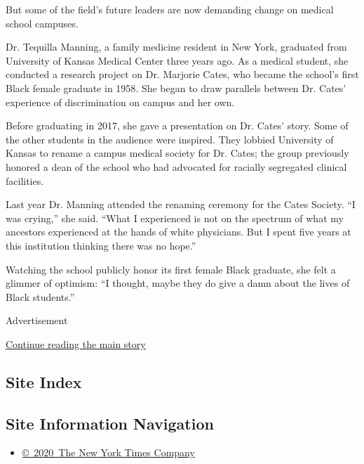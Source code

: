 But some of the field's future leaders are now demanding change on
medical school campuses.

Dr. Tequilla Manning, a family medicine resident in New York, graduated
from University of Kansas Medical Center three years ago. As a medical
student, she conducted a research project on Dr. Marjorie Cates, who
became the school's first Black female graduate in 1958. She began to
draw parallels between Dr. Cates' experience of discrimination on campus
and her own.

Before graduating in 2017, she gave a presentation on Dr. Cates' story.
Some of the other students in the audience were inspired. They lobbied
University of Kansas to rename a campus medical society for Dr. Cates;
the group previously honored a dean of the school who had advocated for
racially segregated clinical facilities.

Last year Dr. Manning attended the renaming ceremony for the Cates
Society. ``I was crying,'' she said. ``What I experienced is not on the
spectrum of what my ancestors experienced at the hands of white
physicians. But I spent five years at this institution thinking there
was no hope.''

Watching the school publicly honor its first female Black graduate, she
felt a glimmer of optimism: ``I thought, maybe they do give a damn about
the lives of Black students.''

Advertisement

\protect\hyperlink{after-bottom}{Continue reading the main story}

\hypertarget{site-index}{%
\subsection{Site Index}\label{site-index}}

\hypertarget{site-information-navigation}{%
\subsection{Site Information
Navigation}\label{site-information-navigation}}

\begin{itemize}
\tightlist
\item
  \href{https://help.nytimes3xbfgragh.onion/hc/en-us/articles/115014792127-Copyright-notice}{©~2020~The
  New York Times Company}
\end{itemize}

